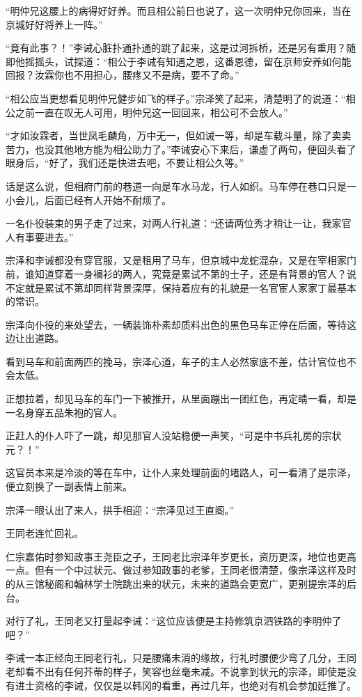 “明仲兄这腰上的病得好好养。而且相公前日也说了，这一次明仲兄你回来，当在京城好好将养上一阵。”

“竟有此事？！”李诫心脏扑通扑通的跳了起来，这是过河拆桥，还是另有重用？随即他摇摇头，试探道：“相公于李诫有知遇之恩，这番恩德，留在京师安养如何能回报？汝霖你也不用担心，腰疼又不是病，要不了命。”

“相公应当更想看见明仲兄健步如飞的样子。”宗泽笑了起来，清楚明了的说道：“相公之前一直在叹无人可用，明仲兄这一回回来，相公可不会放人。”

“才如汝霖者，当世凤毛麟角，万中无一，但如诫一等，却是车载斗量，除了卖卖苦力，也没其他地方能为相公助力了。”李诫安心下来后，谦虚了两句，便回头看了眼身后，“好了，我们还是快进去吧，不要让相公久等。”

话是这么说，但相府门前的巷道一向是车水马龙，行人如织。马车停在巷口只是一小会儿，后面已经有人开始不耐烦了。

一名仆役装束的男子走了过来，对两人行礼道：“还请两位秀才稍让一让，我家官人有事要进去。”

宗泽和李诫都没有穿官服，又是租用了马车，但京城中龙蛇混杂，又是在宰相家门前，谁知道穿着一身襕衫的两人，究竟是累试不第的士子，还是有背景的官人？说不定就是累试不第却同样背景深厚，保持着应有的礼貌是一名官宦人家家丁最基本的常识。

宗泽向仆役的来处望去，一辆装饰朴素却质料出色的黑色马车正停在后面，等待这边让出道路。

看到马车和前面两匹的挽马，宗泽心道，车子的主人必然家底不差，估计官位也不会太低。

正想拉着，却见马车的车门一下被推开，从里面蹦出一团红色，再定睛一看，却是一名身穿五品朱袍的官人。

正赶人的仆人吓了一跳，却见那官人没站稳便一声笑，“可是中书兵礼房的宗状元？！”

这官员本来是冷淡的等在车中，让仆人来处理前面的堵路人，可一看清了是宗泽，便立刻换了一副表情上前来。

宗泽一眼认出了来人，拱手相迎：“宗泽见过王直阁。”

王同老连忙回礼。

仁宗嘉佑时参知政事王尧臣之子，王同老比宗泽年岁更长，资历更深，地位也更高一点。但有一个中过状元、做过参知政事的老爹，王同老很清楚，像宗泽这样及时的从三馆秘阁和翰林学士院跳出来的状元，未来的道路会更宽广，更别提宗泽的后台。

对行了礼，王同老又打量起李诫：“这位应该便是主持修筑京泗铁路的李明仲了吧？”

李诫一本正经向王同老行礼，只是腰痛未消的缘故，行礼时腰便少弯了几分，王同老却看不出有任何芥蒂的样子，笑容也丝毫未减。不说拿到状元的宗泽，即使是没有进士资格的李诫，仅仅是以韩冈的看重，再过几年，也绝对有机会参加廷推了。


